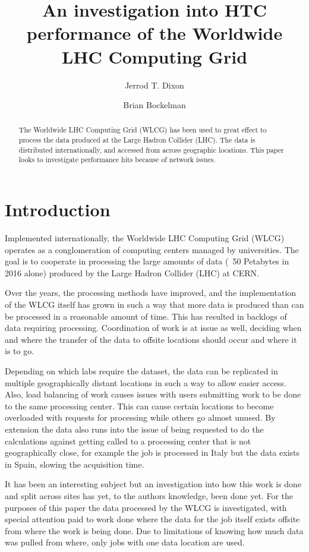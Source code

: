 \documentclass[sigconf]{acmart}
\title{An investigation into HTC performance of the Worldwide LHC Computing Grid}
\author{Jerrod T. Dixon}
\affiliation{%
	\institution{University of Nebraska - Lincoln}
	\streetaddress{1400 R St}
	\city{Lincoln} 
	\state{Nebraska} 
	\postcode{68588}
}
\author{Brian Bockelman}
\affiliation{%
	\institution{University of Nebraska - Lincoln}
	\streetaddress{1400 R St}
	\city{Lincoln} 
	\state{Nebraska} 
	\postcode{68588}
}
\begin{document}
\begin{abstract}
The Worldwide LHC Computing Grid (WLCG) has been used to great effect to process the data produced at the Large Hadron Collider (LHC). The data is distributed internationally, and accessed from across geographic locations. This paper looks to investigate performance hits because of network issues.
\end{abstract}


\maketitle

\section{Introduction}
Implemented internationally, the Worldwide LHC Computing Grid (WLCG)\cite{wlcg} operates as a conglomeration of computing centers managed by universities. The goal is to cooperate in processing the large amounts of data (~50 Petabytes in 2016 alone) produced by the Large Hadron Collider (LHC) at CERN.

Over the years, the processing methods have improved, and the implementation of the WLCG itself has grown in such a way that more data is produced than can be processed in a reasonable amount of time. This has resulted in backlogs of data requiring processing. Coordination of work is at issue as well, deciding when and where the transfer of the data to offsite locations should occur and where it is to go. 

Depending on which labs require the dataset, the data can be replicated in multiple geographically distant locations in such a way to allow easier access. Also, load balancing of work causes issues with users submitting work to be done to the same processing center. This can cause certain locations to become overloaded with requests for processing while others go almost unused. By extension the data also runs into the issue of being requested to do the calculations against getting called to a processing center that is not geographically close, for example the job is processed in Italy but the data exists in Spain, slowing the acquisition time. 

It has been an interesting subject but an investigation into how this work is done and split across sites has yet, to the authors knowledge, been done yet. For the purposes of this paper the data processed by the WLCG is investigated, with special attention paid to work done where the data for the job itself exists offsite from where the work is being done. Due to limitations of knowing how much data was pulled from where, only jobs with one data location are used.
\end{document}
